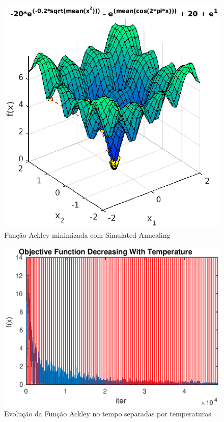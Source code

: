 \documentclass[conference,compsoc]{IEEEtran}
\begin{document}
\begin{figure}[!hctb]
\centering
\includegraphics[scale=0.65]{SA_ackley_3D.eps}
\caption{Função Ackley minimizada com Simulated Annealing}
\label{fig:SA_ackley_3D}
\end{figure}

\begin{figure}[!hctb]
\centering
\includegraphics[scale=0.65]{SA_ackley_T.eps}
\caption{Evolução da Função Ackley no tempo separadas por temperaturas}
\label{fig:SA_ackley_T}
\end{figure}
\end{document}
